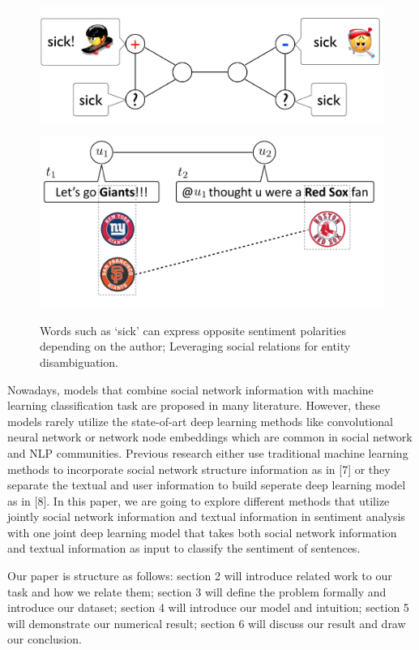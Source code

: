 \begin{figure}[h]
\centering
\begin{minipage}{.5\textwidth}
  \centering
  \includegraphics[width=1\linewidth]{sick}
    \label{fig:test1}
\end{minipage}%
\begin{minipage}{.5\textwidth}
  \centering
  \includegraphics[width=1\linewidth]{Giant}
  
  \label{fig:test2}
\end{minipage}
\caption{Words such as ‘sick’ can express opposite sentiment
polarities depending on the author; Leveraging social relations for entity
disambiguation.}
\end{figure}


Nowadays, models that combine social network information with machine learning classification task are proposed in many literature. However, these models rarely utilize the state-of-art deep learning methods like convolutional neural network or network node embeddings which are common in social network and NLP communities. Previous research either use traditional machine learning methods to incorporate social network structure information as in [7] or they separate the textual and user information to build seperate deep learning model as in [8]. In this paper, we are going to explore different methods that utilize jointly social network information and textual information in sentiment analysis with one joint deep learning model that takes both social network information and textual information as input to classify the sentiment of sentences.

Our paper is structure as follows: section 2 will introduce related work to our task and how we relate them; section 3 will define the problem formally and introduce our dataset; section 4 will introduce our model and intuition; section 5 will demonstrate our numerical result; section 6 will discuss our result and draw our conclusion.
